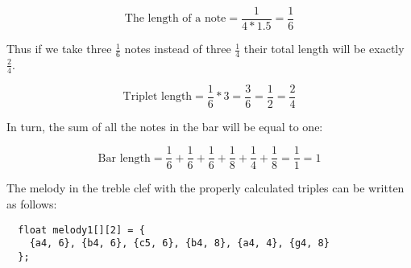 \documentclass[../sparc.tex]{subfiles}
\begin{document}
\begin{equation}
  \mbox{The length of a note} = \frac{1}{4 * 1.5} = \frac{1}{6}
\end{equation}

Thus if we take three $\frac{1}{6}$ notes instead of three $\frac{1}{4}$ their
total length will be exactly $\frac{2}{4}$.

\begin{equation}
  \mbox{Triplet length} = \frac{1}{6} * 3 = \frac{3}{6} = \frac{1}{2}
  = \frac{2}{4}
\end{equation}

In turn, the sum of all the notes in the bar will be equal to one:

\begin{equation}
  \mbox{Bar length} = \frac{1}{6} + \frac{1}{6}
  + \frac{1}{6} + \frac{1}{8} + \frac{1}{4} + \frac{1}{8}
  = \frac{1}{1} = 1
\end{equation}

The melody in the treble clef with the properly calculated triples can be
written as follows:

\begin{verbatim}
  float melody1[][2] = {
    {a4, 6}, {b4, 6}, {c5, 6}, {b4, 8}, {a4, 4}, {g4, 8}
  };
\end{verbatim}
\end{document}
